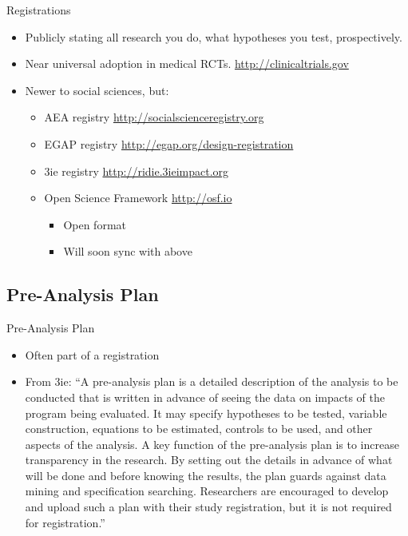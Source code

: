 \documentclass{beamer}
\begin{document}
\begin{frame}{Registrations}
 \begin{itemize}
  \item
   Publicly stating all research you do, what hypotheses you test, prospectively.
  \item
   Near universal adoption in medical RCTs. \url{http://clinicaltrials.gov}
   \item Newer to social sciences, but:
   \begin{itemize}
   \item
   	AEA registry \url{http://socialscienceregistry.org}
   \item
    EGAP registry \url{http://egap.org/design-registration}
   \item 
    3ie registry \url{http://ridie.3ieimpact.org}
   \item
   	Open Science Framework \url{http://osf.io}
   	\begin{itemize}
   	\item
   	Open format
   	\item
   	Will soon sync with above
   	\end{itemize}
   \end{itemize}
  \end{itemize}  
\end{frame}


\subsection{Pre-Analysis Plan}
\begin{frame}{Pre-Analysis Plan}
\pause
\begin{itemize}
\item
Often part of a registration
\item
From 3ie: ``A pre-analysis plan is a detailed description of the analysis to be conducted that is written in advance of seeing the data on impacts of the program being evaluated. It may specify hypotheses to be tested, variable construction, equations to be estimated, controls to be used, and other aspects of the analysis. A key function of the pre-analysis plan is to increase transparency in the research. By setting out the details in advance of what will be done and before knowing the results, the plan guards against data mining and specification searching. Researchers are encouraged to develop and upload such a plan with their study registration, but it is not required for registration.''
\end{itemize}
\end{frame}
\end{document}
